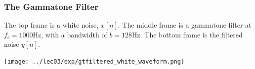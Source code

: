\begin{frame}
  \frametitle{The Gammatone Filter}

  The top frame is a white noise, $x[n]$.  The middle frame is a
  gammatone filter at $f_c=1000$Hz, with a bandwidth of $b=128$Hz.
  The bottom frame is the filtered noise $y[n]$.

  \centerline{\texttt{[image: ../lec03/exp/gtfiltered\_white\_waveform.png]}}
\end{frame}
  
